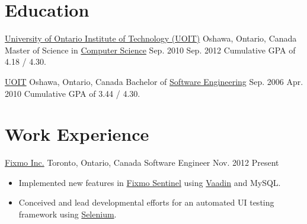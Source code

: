 
  \section{Education}

  \educationEntry
    {\href{http://www.uoit.ca/}{University of Ontario Institute of Technology (UOIT)}}
    {Oshawa, Ontario, Canada}
    {Master of Science in \href{http://gradstudies.uoit.ca/EN/main/future\_students/masters\_programs/computerscience.html}{Computer Science}}
    {Sep. 2010}
    {Sep. 2012}
    {Cumulative GPA of 4.18 / 4.30.}

  \educationEntry
    {\href{http://www.uoit.ca/}{UOIT}}
    {Oshawa, Ontario, Canada}
    {Bachelor of \href{http://engineering.uoit.ca/undergraduate/software/}{Software Engineering}}
    {Sep. 2006}
    {Apr. 2010}
    {Cumulative GPA of 3.44 / 4.30.}

  \section{Work Experience}

  \workEntry
    {\href{http://fixmo.com/}{Fixmo Inc.}}
    {Toronto, Ontario, Canada}
    {Software Engineer}
    {Nov. 2012}
    {Present}
    {
      \begin{itemize}[noitemsep,nolistsep]
        \item Implemented new features in \href{http://fixmo.com/products/sentinel}{Fixmo Sentinel} using \href{https://vaadin.com/}{Vaadin} and MySQL.
        \item Conceived and lead developmental efforts for an automated UI testing framework using \href{https://seleniumhq.org/}{Selenium}.
      \end{itemize}
    }

